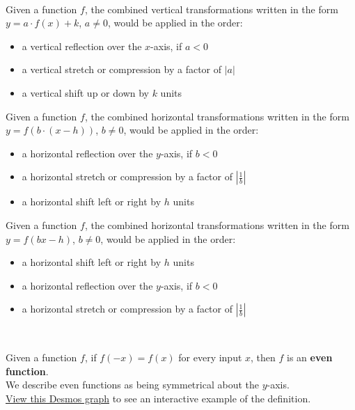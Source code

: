 \begin{myDefinition}~\\[0.5mm]
Given a function $f$, the combined vertical transformations written in the form $y=a\cdot f(x)+k$, $a\neq 0$, would be applied in the order:
\begin{itemize}
	\item a vertical reflection over the $x$-axis, if $a<0$
	\item a vertical stretch or compression by a factor of $|a|$
	\item a vertical shift up or down by $k$ units
\end{itemize}

Given a function $f$, the combined horizontal transformations written in the form $ y=f\left(b\cdot (x-h)\right)$, $b\neq 0$, would be applied in the order:
\begin{itemize}
	\item a horizontal reflection over the $y$-axis, if $b<0$
	\item a horizontal stretch or compression by a factor of $\left|\frac{1}{b}\right|$
	\item a horizontal shift left or right by $h$ units
\end{itemize}

Given a function $f$, the combined horizontal transformations written in the form $y= f(bx-h)$, $b\neq 0$, would be applied in the order:
\begin{itemize}
	\item a horizontal shift left or right by $h$ units
	\item a horizontal reflection over the $y$-axis, if $b<0$
	\item a horizontal stretch or compression by a factor of $\left|\frac{1}{b}\right|$
\end{itemize}
\end{myDefinition}


\begin{myDefinition}~\\[0.5mm]
\begin{minipage}{0.9\linewidth}
Given a function $f$, if $f(-x)=f(x)$ for every input $x$, then $f$ is an  {\bf  even function}.\\
We describe even functions as being symmetrical about the $y$-axis.\\[0.4em]
 \href{https://tiny.cc/111Z-EvenFunction}{View this Desmos graph} to see an interactive example of the definition.%
\end{minipage}
\begin{minipage}{0.1\linewidth}
\flushright {}
\end{minipage}
\end{myDefinition}


